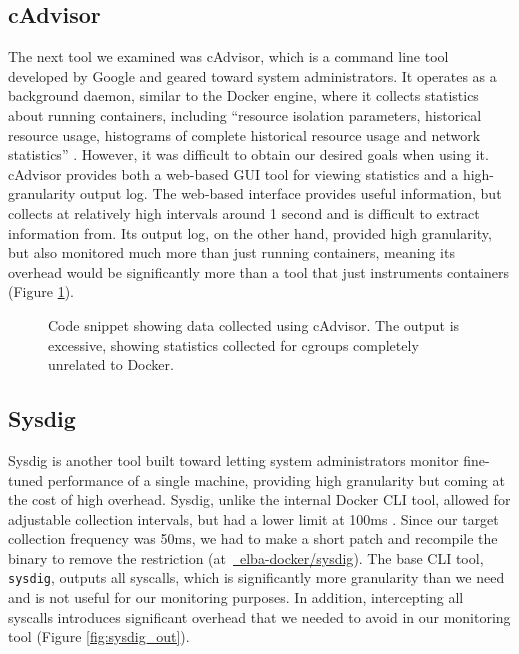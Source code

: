 \documentclass[a4paper,11pt]{article}
\newcommand{\github}[2]{\,\href{https://github.com/#1/#2}{\faGithub~#1/\linebreak[0]#2}\xspace}
\begin{document}
\subsection{cAdvisor}

The next tool we examined was cAdvisor,
which is a command line tool developed by Google and geared toward system administrators.   
It operates as a background daemon, similar to the Docker engine, where it collects statistics about running containers,
including ``resource isolation parameters, historical resource usage,
histograms of complete historical resource usage and network statistics'' \cite{Cadvisor}.
However, it was difficult to obtain our desired goals when using it.
cAdvisor provides both a web-based GUI tool for viewing statistics and a high-granularity output log.
The web-based interface provides useful information,
but collects at relatively high intervals around 1 second and is difficult to extract information from. 
Its output log, on the other hand, provided high granularity, but also monitored much more than just running containers,
meaning its overhead would be significantly more than a tool that just instruments containers (Figure \ref{fig:cadvisor_out}).

\begin{figure}[H]
    
    \caption{
        Code snippet showing data collected using cAdvisor.
        The output is excessive, showing statistics collected for cgroups completely unrelated to Docker.
    }
    \label{fig:cadvisor_out}
\end{figure}

\subsection{Sysdig}

Sysdig is another tool built toward letting system administrators monitor fine-tuned performance of a single machine,
providing high granularity but coming at the cost of high overhead.
Sysdig, unlike the internal Docker CLI tool, allowed for adjustable collection intervals,
but had a lower limit at 100ms \cite{SysDigLimit}.
Since our target collection frequency was 50ms,
we had to make a short patch and recompile the binary to remove the restriction
(at \github{elba-docker}{sysdig}).
The base CLI tool, \texttt{sysdig}, outputs all syscalls,
which is significantly more granularity than we need and is not useful for our monitoring purposes.
In addition, intercepting all syscalls introduces significant overhead that we needed to avoid in our monitoring tool (Figure \ref{fig:sysdig_out}).
\end{document}
